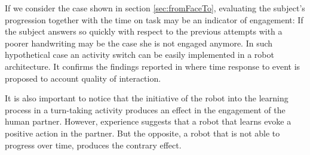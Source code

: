 \documentclass{sig-alternate}
\begin{document}
If we consider the case shown in section \ref{sec:fromFaceTo}, evaluating the
subject's progression together with the time on task may be an indicator of
engagement: If the subject answers so quickly with respect to the previous
attempts with a poorer handwriting may be the case she is not engaged anymore.
In such hypothetical case an activity switch can be easily implemented in a
robot architecture. It confirms the findings reported in \cite{anzalone} where
time response to event is proposed to account quality of interaction. 
%
%
%
%
%
%  
%
%

It is also important to notice that the initiative of the robot into the
learning process in a turn-taking activity produces an effect in the engagement
of the human partner. However, experience suggests that a robot that learns
evoke a positive action in the partner. But the opposite, a robot that is not
able to progress over time, produces the contrary effect.
\end{document}
